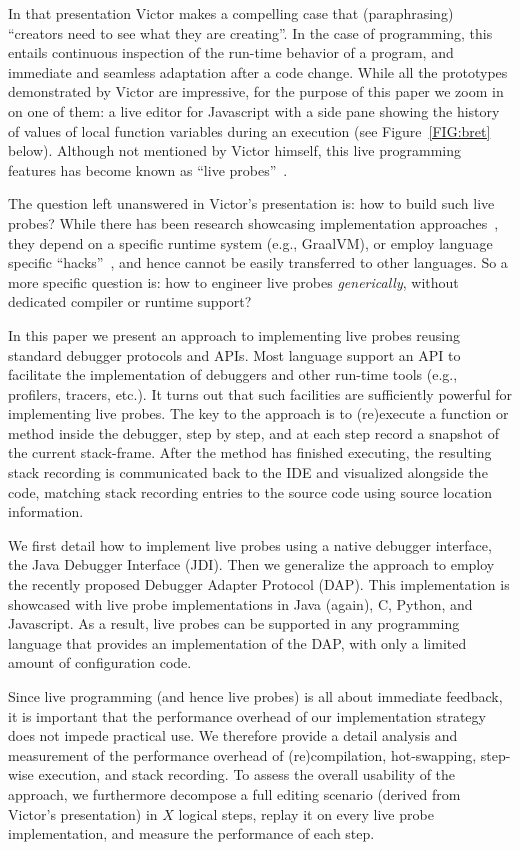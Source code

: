 \documentclass[english,submission]{programming}
\begin{document}
In that presentation Victor makes a compelling case that (paraphrasing) ``creators need to see what they are creating''. In the case of programming, this entails continuous inspection of the run-time behavior of a program, and immediate and seamless adaptation after a code change. While all the prototypes demonstrated by Victor are impressive, for the purpose of this paper we zoom in on one of them: a live editor for Javascript with a side pane showing the history of values of local function variables during an execution (see Figure~\ref{FIG:bret} below). Although not mentioned by Victor himself, this live programming features has become known as ``live probes''~\cite{UsableLiveProgramming,ExampleBasedGraalVM}.

The question left unanswered in Victor's presentation is: how to build such live probes? While there has been research showcasing implementation approaches~\cite{ExampleBasedGraalVM}, they depend on a specific runtime system (e.g., GraalVM), or employ language specific ``hacks''~\cite{LiveLiterals}, and hence cannot be easily transferred to other languages. So a more specific question is: how to  engineer live probes \textit{generically}, without dedicated compiler or runtime support?

In this paper we present an approach to implementing live probes reusing standard debugger protocols and APIs. Most language support an API to facilitate the implementation of debuggers and other run-time tools (e.g., profilers, tracers, etc.). It turns out that such facilities are sufficiently powerful for implementing live probes. The key to the approach is to (re)execute a function or method inside the debugger, step by step, and at each step record a snapshot of the current stack-frame. After the method has finished executing, the resulting stack recording is communicated back to the IDE and visualized alongside the code, matching stack recording entries to the source code using source location information.

We first detail how to implement live probes using a native debugger interface, the Java Debugger Interface (JDI). Then we generalize the approach to employ the recently proposed Debugger Adapter Protocol (DAP). 
This implementation is showcased with live probe implementations in Java (again), C, Python, and Javascript. 
As a result, live probes can be supported in any programming language that provides an implementation of the DAP, with only a limited amount of configuration code.  

Since live programming (and hence live probes) is all about immediate feedback, it is important that the performance overhead of our implementation strategy does not impede practical use. We therefore provide a detail analysis and measurement of the performance overhead of (re)compilation, hot-swapping, step-wise execution, and stack recording. To assess the overall usability of the approach, we furthermore decompose a full editing scenario (derived from Victor's presentation) in $X$ logical steps, replay it on every live probe implementation, and measure the performance of each step.
\end{document}

